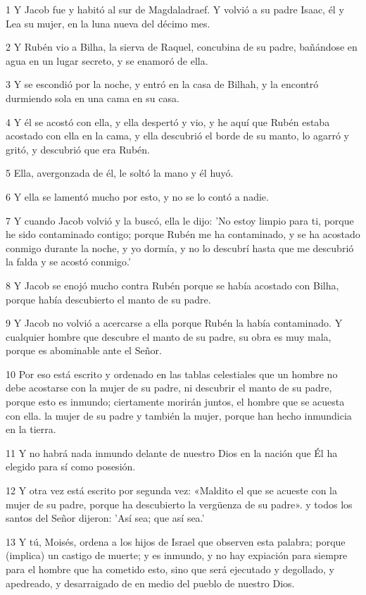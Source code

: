 \par 1 Y Jacob fue y habitó al sur de Magdaladraef. Y volvió a su padre Isaac, él y Lea su mujer, en la luna nueva del décimo mes.
\par 2 Y Rubén vio a Bilha, la sierva de Raquel, concubina de su padre, bañándose en agua en un lugar secreto, y se enamoró de ella.
\par 3 Y se escondió por la noche, y entró en la casa de Bilhah, y la encontró durmiendo sola en una cama en su casa.
\par 4 Y él se acostó con ella, y ella despertó y vio, y he aquí que Rubén estaba acostado con ella en la cama, y ​​ella descubrió el borde de su manto, lo agarró y gritó, y descubrió que era Rubén.
\par 5 Ella, avergonzada de él, le soltó la mano y él huyó.
\par 6 Y ella se lamentó mucho por esto, y no se lo contó a nadie.
\par 7 Y cuando Jacob volvió y la buscó, ella le dijo: 'No estoy limpio para ti, porque he sido contaminado contigo; porque Rubén me ha contaminado, y se ha acostado conmigo durante la noche, y yo dormía, y no lo descubrí hasta que me descubrió la falda y se acostó conmigo.'
\par 8 Y Jacob se enojó mucho contra Rubén porque se había acostado con Bilha, porque había descubierto el manto de su padre.
\par 9 Y Jacob no volvió a acercarse a ella porque Rubén la había contaminado. Y cualquier hombre que descubre el manto de su padre, su obra es muy mala, porque es abominable ante el Señor.
\par 10 Por eso está escrito y ordenado en las tablas celestiales que un hombre no debe acostarse con la mujer de su padre, ni descubrir el manto de su padre, porque esto es inmundo; ciertamente morirán juntos, el hombre que se acuesta con ella. la mujer de su padre y también la mujer, porque han hecho inmundicia en la tierra.
\par 11 Y no habrá nada inmundo delante de nuestro Dios en la nación que Él ha elegido para sí como posesión.
\par 12 Y otra vez está escrito por segunda vez: «Maldito el que se acueste con la mujer de su padre, porque ha descubierto la vergüenza de su padre». y todos los santos del Señor dijeron: 'Así sea; que así sea.'
\par 13 Y tú, Moisés, ordena a los hijos de Israel que observen esta palabra; porque (implica) un castigo de muerte; y es inmundo, y no hay expiación para siempre para el hombre que ha cometido esto, sino que será ejecutado y degollado, y apedreado, y desarraigado de en medio del pueblo de nuestro Dios.
